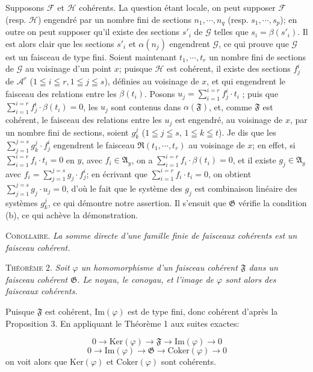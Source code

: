 Supposons $\mathcal{F}$ et $\mathcal{H}$ cohérents. La question étant locale, on peut supposer $\mathcal{F}$ (resp. $\mathcal{H}$) engendré par un nombre fini de sections $n_1 , \cdots , n_q$ (resp. $s_1 , \cdots , s_p$); en outre on peut supposer qu'il existe des sections $s'_i$ de $\mathcal{G}$ telles que $s_i = \beta(s'_i)$. Il est alors clair que les sections $s'_i$ et $\alpha(n_j)$ engendrent $\mathcal{G}$, ce qui prouve que $\mathcal{G}$ est un faisceau de type fini. Soient maintenant $t_1 , \cdots , t_r$ un nombre fini de sections de $\mathcal{G}$ au voisinage d'un point $x$; puisque $\mathcal{H}$ est cohérent, il existe des sections $f^i_j$ de $\mathcal{A}^r$ ($1 \leqq i \leqq r, 1 \leqq j \leqq s$), définies au voisinage de $x$, et qui engendrent le faisceau des relations entre les $\beta(t_i)$. Posons $u_j = \sum_{i=1}^{i=r} f^i_j \cdot t_i$ ; puis
que $\sum_{i=1}^{i=r} f_j^i \cdot \beta(t_i) = 0$, les $u_j$ sont contenus dans $\alpha(\mathfrak{F})$, et, comme $\mathfrak{F}$ est cohérent, le faisceau des relations entre les $u_j$ est engendré, au voisinage de $x$, par un nombre fini de sections, soient $g_k^j$ ($1 \leqq j \leqq s$, $1 \leqq k \leqq t$). Je dis que les $\sum_{j=1}^{j=s} g_k^j \cdot f_j^i$ engendrent le faisceau $\mathfrak{R}(t_1, \cdots, t_r)$ au voisinage de $x$; en effet, si $\sum_{i=1}^{i=r} f_i \cdot t_i = 0$ en $y$, avec $f_i \in \mathfrak{A}_y$, on a $\sum_{i=1}^{i=r} f_i \cdot \beta(t_i) = 0$, et il existe $g_j \in \mathfrak{A}_y$ avec $f_i = \sum_{j=1}^{j=s} g_j \cdot f_j^i$; en écrivant que $\sum_{i=1}^{i=r} f_i \cdot t_i = 0$, on obtient $\sum_{j=1}^{j=s} g_j \cdot u_j = 0$, d'où le fait que le système des $g_j$ est combinaison linéaire des systèmes $g_k^j$, ce qui démontre notre assertion. Il s'ensuit que $\mathfrak{G}$ vérifie la condition (b), ce qui achève la démonstration.

\textsc{Corollaire}. \emph{La somme directe d'une famille finie de faisceaux cohérents est un faisceau cohérent.}

\textsc{Théorème} 2. \emph{Soit $\varphi$ un homomorphisme d'un faisceau cohérent $\mathfrak{F}$ dans un faisceau cohérent $\mathfrak{G}$. Le noyau, le conoyau, et l'image de $\varphi$ sont alors des faisceaux cohérents.}

Puisque $\mathfrak{F}$ est cohérent, $\mathrm{Im}(\varphi)$ est de type fini, donc cohérent d'après la Proposition 3. En appliquant le Théorème 1 aux suites exactes:

\begin{equation*}
0 \to \mathrm{Ker}(\varphi) \to \mathfrak{F} \to \mathrm{Im}(\varphi) \to 0
\end{equation*}
\begin{equation*}
0 \to \mathrm{Im}(\varphi) \to \mathfrak{G} \to \mathrm{Coker}(\varphi) \to 0
\end{equation*}
on voit alors que $\mathrm{Ker}(\varphi)$ et $\mathrm{Coker}(\varphi)$ sont cohérents.

